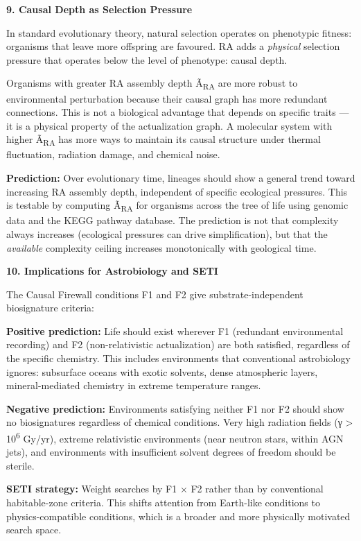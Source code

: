 \documentclass[12pt,a4paper]{article}
\begin{document}
\textbf{9. Causal Depth as Selection Pressure}

In standard evolutionary theory, natural selection operates on
phenotypic fitness: organisms that leave more offspring are favoured. RA
adds a \emph{physical} selection pressure that operates below the level
of phenotype: causal depth.

Organisms with greater RA assembly depth Ã\textsubscript{RA} are more
robust to environmental perturbation because their causal graph has more
redundant connections. This is not a biological advantage that depends
on specific traits --- it is a physical property of the actualization
graph. A molecular system with higher Ã\textsubscript{RA} has more ways
to maintain its causal structure under thermal fluctuation, radiation
damage, and chemical noise.

\textbf{Prediction:} Over evolutionary time, lineages should show a
general trend toward increasing RA assembly depth, independent of
specific ecological pressures. This is testable by computing
Ã\textsubscript{RA} for organisms across the tree of life using genomic
data and the KEGG pathway database. The prediction is not that
complexity always increases (ecological pressures can drive
simplification), but that the \emph{available} complexity ceiling
increases monotonically with geological time.

\textbf{10. Implications for Astrobiology and SETI}

The Causal Firewall conditions F1 and F2 give substrate-independent
biosignature criteria:

\textbf{Positive prediction:} Life should exist wherever F1 (redundant
environmental recording) and F2 (non-relativistic actualization) are
both satisfied, regardless of the specific chemistry. This includes
environments that conventional astrobiology ignores: subsurface oceans
with exotic solvents, dense atmospheric layers, mineral-mediated
chemistry in extreme temperature ranges.

\textbf{Negative prediction:} Environments satisfying neither F1 nor F2
should show no biosignatures regardless of chemical conditions. Very
high radiation fields (γ \textgreater{} 10\textsuperscript{6} Gy/yr),
extreme relativistic environments (near neutron stars, within AGN jets),
and environments with insufficient solvent degrees of freedom should be
sterile.

\textbf{SETI strategy:} Weight searches by F1 × F2 rather than by
conventional habitable-zone criteria. This shifts attention from
Earth-like conditions to physics-compatible conditions, which is a
broader and more physically motivated search space.
\end{document}
